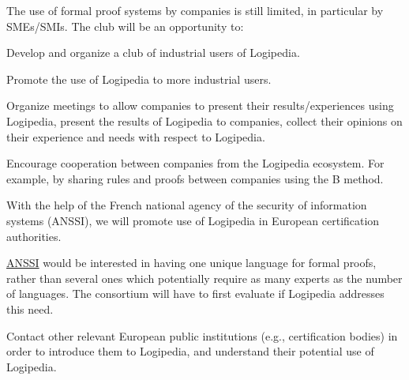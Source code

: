 \begin{workpackage}[id=dissemination,type=MGT,wphases=1-48,
  short={Dissemination},
  title={Dissemination, communication and exploitation},
  lead=Lie,LieRM=1,InrRM=6,BirRM=4,CleRM=2,ImtRM=2,StrRM=2,ZibRM=14,EduRM=12]
\begin{tasklist}
  \begin{task}[id=industrial-club,
    title=Expanding the use of Logipedia in the industry,
    shorttitle=Industry,
    lead=Cle,CleRM=2,wphases=1-48!.05]
    The use of formal proof systems by companies is still limited, in particular by SMEs/SMIs. The club will be an opportunity to:
    \begin{compactitem}
    \item Develop and organize a club of industrial users of Logipedia.
    \item Promote the use of Logipedia to more industrial users.
    \item Organize meetings to allow companies to present their results/experiences using Logipedia, present the results of Logipedia to companies, collect their opinions on their experience and needs with respect to Logipedia.
    \item Encourage cooperation between companies from the Logipedia
      ecosystem. For example, by sharing rules and proofs between companies using the B method.
    \end{compactitem}
  \end{task}

  \begin{task}[id=certifiers-club,
      title=Promoting the use of Logipedia by certification authorities,
      shorttitle=Certif.,
      lead=Imt,ImtRM=2,wphases=1-48!.05]
    With the help of the French national agency of the security of
    information systems (ANSSI), we will promote use of Logipedia in
    European certification authorities.
    \begin{compactitem}
    \item \href{https://www.ssi.gouv.fr/}{ANSSI} would be interested in having one unique language for formal
proofs, rather than several ones which potentially require as many
experts as the number of languages. The consortium will have to first
evaluate if Logipedia addresses 
this need.
\item Contact other relevant European public institutions
(e.g., certification bodies) in order to introduce them to Logipedia,
and understand their potential use of Logipedia.
    \end{compactitem}
  \end{task}


\end{tasklist}
\end{workpackage}
